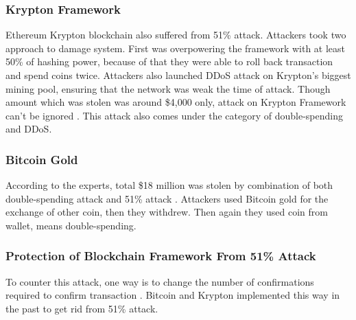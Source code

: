 \documentclass[a4paper,twoside,12pt]{report}
\begin{document}
\begin{spacing}{1.5}
\subsubsection{Krypton Framework}
Ethereum Krypton blockchain also suffered from 51\% attack. Attackers took two approach to damage system. First was overpowering the framework with at least 50\% of hashing power, because of that they were able to roll back transaction and spend coins twice. Attackers also launched DDoS attack on Krypton's biggest mining pool, ensuring that the network was weak the time of attack. Though amount which was stolen was around \$4,000  only, attack on Krypton Framework can't be ignored \cite{51attackonethereum}. This attack also comes under the category of double-spending and DDoS.
\subsubsection{Bitcoin Gold}
According to the experts, total \$18 million was stolen by combination of both double-spending attack and 51\% attack \cite{51attackonbitcoingold}. Attackers used Bitcoin gold for the exchange of other coin, then they withdrew. Then again they used coin from wallet, means double-spending. 
\subsubsection{Protection of Blockchain Framework From 51\% Attack}
To counter this attack, one way is to change the number of confirmations required to confirm transaction \cite{what_is_51attack_2018}. Bitcoin and Krypton implemented this way in the past to get rid from 51\% attack.

\end{spacing}
\end{document}
